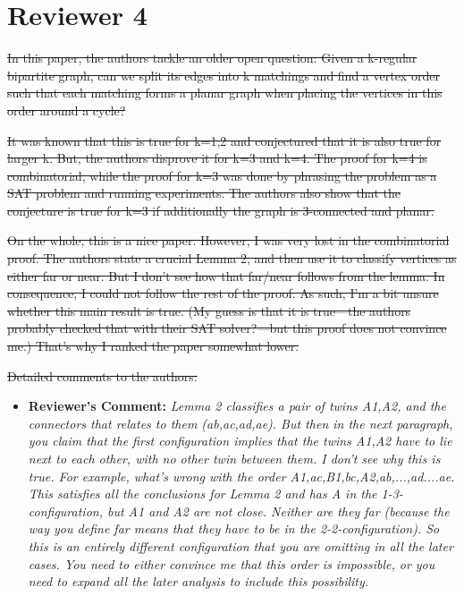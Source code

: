 \documentclass{article}
\newcommand{\rcomment}[1]{\vspace{0.3cm} \item \textbf{Reviewer's Comment:} {\em #1}}
\begin{document}
\begin{itemize}
{\begin{itemize}
\end{itemize}

\newpage
\section*{Reviewer 4}

\st{In this paper, the authors tackle an older open question:  Given a k-regular bipartite graph, can we split its edges into k matchings and find a vertex order such that each matching forms a planar graph when placing the vertices in this order around a cycle?}

\st{It was known that this is true for k=1,2 and conjectured that it is also true for larger k.  But, the authors disprove it for k=3 and k=4.  The proof for k=4 is combinatorial, while the proof for k=3 was done by phrasing the problem as a SAT problem and running experiments.  The authors also show that the conjecture is true for k=3 if additionally the graph is 3-connected and planar.}

\st{On the whole, this is a nice paper.  However, I was very lost in the combinatorial proof.  The authors state a crucial Lemma 2, and then use it to classify vertices as either far or near.  But I don't see how that far/near follows from the lemma.  In consequence, I could not follow the rest of the proof.  As such, I'm a bit unsure whether this main result is true.  (My guess is that it is true---the authors probably checked that with their SAT solver?---but this proof does not convince me.) That's why I ranked the paper somewhat lower.}

\st{Detailed comments to the authors:}

\begin{itemize}
\rcomment{Lemma 2 classifies a pair of twins A1,A2, and the connectors that relates to them (ab,ac,ad,ae).  But then in the next paragraph, you claim that the first configuration implies that the twins A1,A2 have to lie next to each other, with no other twin between them.  I don't see why this is true.  For example, what's wrong with the order A1,ac,B1,bc,A2,ab,...,ad....ae.  This satisfies all the conclusions for Lemma 2 and has A in the 1-3-configuration, but A1 and A2 are not close.  Neither are they far (because the way you define far means that they have to be in the 2-2-configuration).    So this is an entirely different configuration that you are omitting in all the later cases. You need to either convince me that this order is impossible, or you need to expand all the later analysis to include this possibility.}


\end{itemize}}
\end{itemize}
\end{document}
